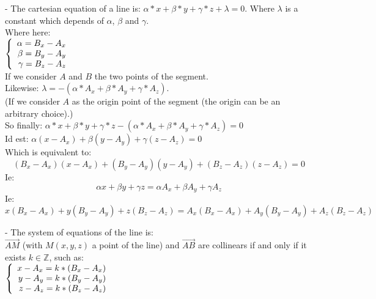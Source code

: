 \documentclass{article}
\begin{document}
    	- The cartesian equation of a line is: $\alpha * x + \beta * y + \gamma * z + \lambda = 0$. Where $\lambda$ is a constant which depends of $\alpha$, $\beta$ and $\gamma$.
    	\\Where here:\\
    	$\left\{\begin{array}{r c l}
    	    \alpha=B_x - A_x\\
    	    \beta=B_y - A_y\\
    	    \gamma=B_z - A_z\\
    	\end{array}\right.$\\
    	If we consider $A$ and $B$ the two points of the segment.\\
    	Likewise: $\lambda = -(\alpha * A_x + \beta * A_y + \gamma * A_z)$.\\
    	(If we consider $A$ as the origin point of the segment (the origin can be an arbitrary choice).)\\
    	So finally: $\alpha * x + \beta * y + \gamma * z - (\alpha * A_x + \beta * A_y + \gamma * A_z) = 0$\\
    	Id est: $\alpha(x - A_x) + \beta(y - A_y) + \gamma(z - A_z) = 0$\\
    	Which is equivalent to:\\
    	$$(B_x - A_x)(x - A_x) + (B_y - A_y)(y - A_y) + (B_z - A_z)(z - A_z) = 0$$
    	Ie:
    	$$\alpha x + \beta y + \gamma z = \alpha A_x + \beta A_y + \gamma A_z$$
    	Ie:
    	$$x (B_x - A_x) + y (B_y - A_y) + z (B_z - A_z) = A_x (B_x - A_x) + A_y (B_y - A_y) + A_z (B_z - A_z)$$
    	
    
    - The system of equations of the line is:\\
    $\overrightarrow{AM}$ (with $M(x, y, z)$ a point of the line) and $\overrightarrow{AB}$ are collinears if and only if it exists $k \in \mathbb{Z}$, such as:\\
    $\left\{\begin{array}{r c l}
    	    x - A_x = k * (B_x - A_x)\\
    	    y - A_y = k * (B_y - A_y)\\
    	    z - A_z = k * (B_z - A_z)
    \end{array}\right.$\\\\
    
\end{document}
